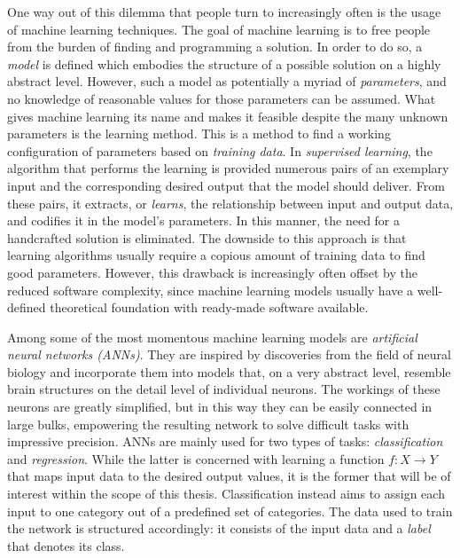 \documentclass[11pt, a4paper]{article}
\begin{document}
One way out of this dilemma that people turn to increasingly often is the usage of machine learning techniques. The goal of machine learning is to free people from the burden of finding and programming a solution. In order to do so, a \emph{model} is defined which embodies the structure of a possible solution on a highly abstract level. However, such a model as potentially a myriad of \emph{parameters}, and no knowledge of reasonable values for those parameters can be assumed. What gives machine learning its name and makes it feasible despite the many unknown parameters is the learning method. This is a method to find a working configuration of parameters based on \emph{training data}. In \emph{supervised learning}, the algorithm that performs the learning is provided numerous pairs of an exemplary input and the corresponding desired output that the model should deliver. From these pairs, it extracts, or \emph{learns}, the relationship between input and output data, and codifies it in the model's parameters. In this manner, the need for a handcrafted solution is eliminated. The downside to this approach is that learning algorithms usually require a copious amount of training data to find good parameters. However, this drawback is increasingly often offset by the reduced software complexity, since machine learning models usually have a well-defined theoretical foundation with ready-made software available.

Among some of the most momentous machine learning models are \emph{artificial neural networks (ANNs)}. They are inspired by discoveries from the field of neural biology and incorporate them into models that, on a very abstract level, resemble brain structures on the detail level of individual neurons. The workings of these  neurons are greatly simplified, but in this way they can be easily connected in large bulks, empowering the resulting network to solve difficult tasks with impressive precision. ANNs are mainly used for two types of tasks: \emph{classification} and \emph{regression}. While the latter is concerned with learning a function $f: X \rightarrow Y$ that maps input data to the desired output values, it is the former that will be of interest within the scope of this thesis. Classification instead aims to assign each input to one category out of a predefined set of categories. The data used to train the network is structured accordingly: it consists of the input data and a \emph{label} that denotes its class.
\end{document}
